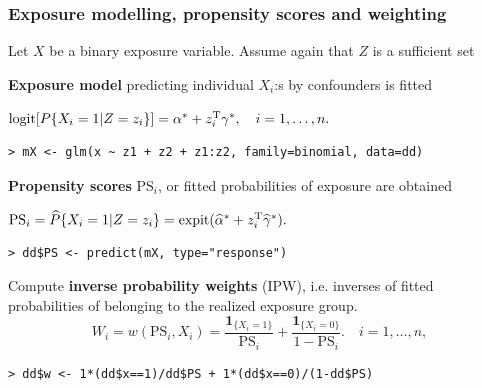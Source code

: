 \documentclass[12pt,dvipsnames,t,aspectratio=169, handout%
]{beamer}
\begin{document}
\begin{frame}[fragile]
\frametitle{\large Exposure modelling, propensity scores and weighting}

Let $X$ be a binary exposure variable. Assume again that $Z$ is a sufficient set 
\pause
\bi
\item
{\bf Exposure model} predicting individual $X_i$:s by confounders is fitted
\begin{center}
$
 \text{logit}[P\{X_i=1|Z=z_i\}] = \alpha^* + z_i^{\small\text{T}}\gamma^*, \quad i=1, \dots, n.
$
\end{center} 
\pause
{\small \color{blue}
\begin{verbatim}
> mX <- glm(x ~ z1 + z2 + z1:z2, family=binomial, data=dd)
\end{verbatim}
}
\pause
\medskip
\item
{\bf Propensity scores} PS$_i$, or fitted  
probabilities of exposure are obtained
\begin{center}
$ \text{PS}_i = \widehat{P}\{X_i=1|Z=z_i\} = \text{expit}(\widehat\alpha^* + z_i^{\small\text{T}}\widehat\gamma^* ). $
\end{center}
\pause
{\small \color{blue}
\begin{verbatim}
> dd$PS <- predict(mX, type="response")
\end{verbatim}
} 
\pause
\medskip
\item
Compute {\bf inverse probability weights} (IPW), 
i.e.  inverses of fitted probabilities of belonging to the realized exposure group. 
$$ W_i = w(\text{PS}_i, X_i) = \frac{ {\mathbf 1}_{ \{X_i=1\} } }{\text{PS}_i} +
                    \frac{ {\mathbf 1}_{ \{X_i=0\} } }{1 - \text{PS}_i}.
  \quad i=1, \dots, n ,
$$
{\small \color{blue}
\begin{verbatim}
> dd$w <- 1*(dd$x==1)/dd$PS + 1*(dd$x==0)/(1-dd$PS)
\end{verbatim}
}
\ei
\end{frame}
\end{document}
